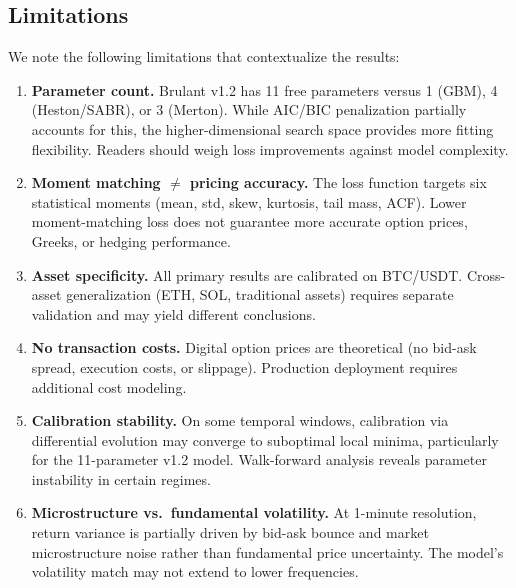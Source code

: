 \documentclass[11pt,a4paper]{article}
\begin{document}
\subsection{Limitations}
\label{sec:limitations}

We note the following limitations that contextualize the results:

\begin{enumerate}[nosep]
  \item \textbf{Parameter count.} Brulant v1.2 has 11 free parameters versus
    1 (GBM), 4 (Heston/SABR), or 3 (Merton). While AIC/BIC penalization
    partially accounts for this, the higher-dimensional search space provides
    more fitting flexibility. Readers should weigh loss improvements against
    model complexity.

  \item \textbf{Moment matching $\neq$ pricing accuracy.} The loss function
    targets six statistical moments (mean, std, skew, kurtosis, tail mass,
    ACF). Lower moment-matching loss does not guarantee more accurate option
    prices, Greeks, or hedging performance.

  \item \textbf{Asset specificity.} All primary results are calibrated on
    BTC/USDT. Cross-asset generalization (ETH, SOL, traditional assets)
    requires separate validation and may yield different conclusions.

  \item \textbf{No transaction costs.} Digital option prices are theoretical
    (no bid-ask spread, execution costs, or slippage). Production deployment
    requires additional cost modeling.

  \item \textbf{Calibration stability.} On some temporal windows, calibration
    via differential evolution may converge to suboptimal local minima,
    particularly for the 11-parameter v1.2 model. Walk-forward analysis
    reveals parameter instability in certain regimes.

  \item \textbf{Microstructure vs.\ fundamental volatility.} At 1-minute
    resolution, return variance is partially driven by bid-ask bounce and
    market microstructure noise rather than fundamental price uncertainty.
    The model's volatility match may not extend to lower frequencies.
\end{enumerate}
\end{document}
